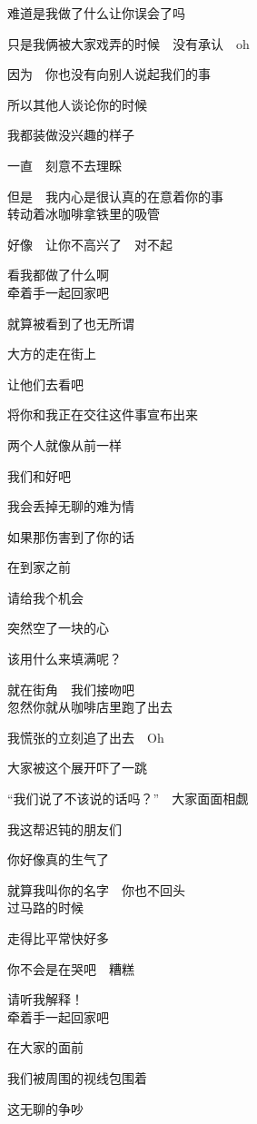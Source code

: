难道是我做了什么让你误会了吗

只是我俩被大家戏弄的时候　没有承认　oh

因为　你也没有向别人说起我们的事

所以其他人谈论你的时候

我都装做没兴趣的样子

一直　刻意不去理睬

但是　我内心是很认真的在意着你的事
\\

转动着冰咖啡拿铁里的吸管

好像　让你不高兴了　对不起

看我都做了什么啊
\\

牵着手一起回家吧

就算被看到了也无所谓

大方的走在街上

让他们去看吧

将你和我正在交往这件事宣布出来

两个人就像从前一样

我们和好吧

我会丢掉无聊的难为情

如果那伤害到了你的话

在到家之前

请给我个机会

突然空了一块的心

该用什么来填满呢？

就在街角　我们接吻吧
\\

忽然你就从咖啡店里跑了出去

我慌张的立刻追了出去　Oh

大家被这个展开吓了一跳

“我们说了不该说的话吗？”　大家面面相觑

我这帮迟钝的朋友们

你好像真的生气了

就算我叫你的名字　你也不回头
\\

过马路的时候

走得比平常快好多

你不会是在哭吧　糟糕

请听我解释！
\\

牵着手一起回家吧

在大家的面前

我们被周围的视线包围着

这无聊的争吵

